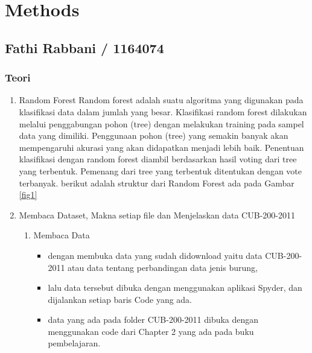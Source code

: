 \chapter{Methods}

\section{Fathi Rabbani / 1164074}
\subsection{Teori}
\begin{enumerate}
\item Random Forest
\subitem
Random forest  adalah suatu algoritma yang digunakan pada klasifikasi data dalam jumlah yang besar. Klasifikasi random forest dilakukan melalui penggabungan pohon (tree) dengan melakukan training pada sampel data yang dimiliki. Penggunaan pohon (tree) yang semakin banyak akan mempengaruhi akurasi yang akan didapatkan menjadi lebih baik. Penentuan klasifikasi dengan random forest diambil berdasarkan hasil voting dari tree yang terbentuk. Pemenang dari tree yang terbentuk ditentukan dengan vote terbanyak. berikut adalah struktur dari Random Forest ada pada Gambar \ref{fig1}

\item Membaca Dataset, Makna setiap file dan Menjelaskan data CUB-200-2011
\begin{enumerate}
\item Membaca Data
\begin{itemize}
\item
dengan membuka data yang sudah didownload yaitu data CUB-200-2011 atau data tentang perbandingan data jenis burung,
\item
lalu data tersebut dibuka dengan menggunakan aplikasi Spyder, dan dijalankan setiap baris Code yang ada.
\item data yang ada pada folder CUB-200-2011 dibuka dengan menggunakan code dari Chapter 2 yang ada pada buku pembelajaran.
\end{itemize}


\end{enumerate}
\end{enumerate}

